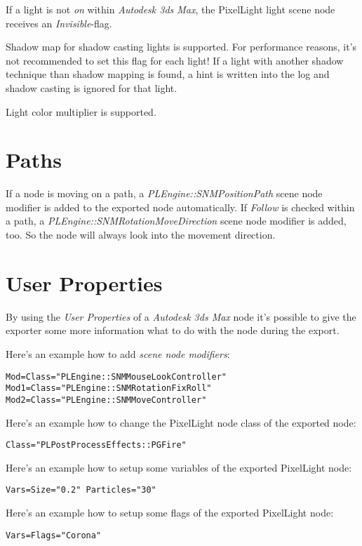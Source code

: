 If a light is not \emph{on} within \emph{Autodesk 3ds Max}, the PixelLight light scene node receives an \emph{Invisible}-flag.

Shadow map for shadow casting lights is supported. For performance reasons, it's not recommended to set this flag for each light! If a light with another shadow technique than shadow mapping is found, a hint is written into the log and shadow casting is ignored for that light.

Light color multiplier is supported.




\section{Paths}
If a node is moving on a path, a \emph{PLEngine::SNMPositionPath} scene node modifier is added to the exported node automatically. If \emph{Follow} is checked within a path, a \emph{PLEngine::SNMRotationMoveDirection} scene node modifier is added, too. So the node will always look into the movement direction.





\section{User Properties}
By using the \emph{User Properties} of a \emph{Autodesk 3ds Max} node it's possible to give the exporter some more information what to do with the node during the export.

Here's an example how to add \emph{scene node modifiers}:

\begin{lstlisting}[caption=Multiple scene node modifiers]
Mod=Class="PLEngine::SNMMouseLookController"
Mod1=Class="PLEngine::SNMRotationFixRoll"
Mod2=Class="PLEngine::SNMMoveController"
\end{lstlisting}

Here's an example how to change the PixelLight node class of the exported node:

\begin{lstlisting}[caption=Setting the scene node class]
Class="PLPostProcessEffects::PGFire"
\end{lstlisting}

Here's an example how to setup some variables of the exported PixelLight node:

\begin{lstlisting}[caption=Setting scene node variables]
Vars=Size="0.2" Particles="30"
\end{lstlisting}

Here's an example how to setup some flags of the exported PixelLight node:

\begin{lstlisting}[caption=Setting scene node flags]
Vars=Flags="Corona"
\end{lstlisting}
